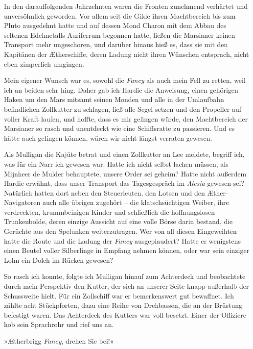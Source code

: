 In den darauffolgenden Jahrzehnten waren die Fronten zunehmend
verhärtet und unversöhnlich geworden. Vor allem seit die Gilde
ihren Machtbereich bis zum Pluto ausgedehnt hatte und auf dessen
Mond Charon mit dem Abbau des seltenen Edelmetalls Auriferrum
begonnen hatte, ließen die Marsianer keinen Transport mehr
ungeschoren, und darüber hinaus hieß es, dass sie mit den Kapitänen
der Ætherschiffe, deren Ladung nicht ihren Wünschen entsprach,
nicht eben zimperlich umgingen.

Mein eigener Wunsch war es, sowohl die \emph{Fancy} als auch mein
Fell zu retten, weil ich an beiden sehr hing. Daher gab ich Hardie
die Anweisung, einen gehörigen Haken um den Mars mitsamt seinen
Monden und alle in der Umlaufbahn befindlichen Zollkutter zu
schlagen, ließ alle Segel setzen und den Propeller auf voller Kraft
laufen, und hoffte, dass es mir gelingen würde, den Machtbereich
der Marsianer so rasch und unentdeckt wie eine Schiffsratte zu
passieren. Und es hätte auch gelingen können, wären wir nicht
längst verraten gewesen.

\bigpar

Als Mulligan die Kajüte betrat und einen Zollkutter an Lee meldete,
begriff ich, was für ein Narr ich gewesen war. Hatte ich nicht
selbst lachen müssen, als Mijnheer de Mulder behauptete, unsere
Order sei geheim? Hatte nicht außerdem Hardie erwähnt, dass unser
Transport das Tagesgespräch im \emph{Alesia} gewesen sei? Natürlich
hatten dort neben den Steuerleuten, den Lotsen und den
Æther-Navigatoren auch alle übrigen zugehört – die klatschsüchtigen
Weiber, ihre verdreckten, krummbeinigen Kinder und schließlich die
hoffnungslosen Trunkenbolde, deren einzige Aussicht auf eine volle
Börse darin bestand, die Gerüchte aus den Spelunken weiterzutragen.
Wer von all diesen Eingeweihten hatte die Route und die Ladung der
\emph{Fancy} ausgeplaudert? Hatte er wenigstens einen Beutel voller
Silberlinge in Empfang nehmen können, oder war sein einziger Lohn
ein Dolch im Rücken gewesen?

\bigpar

So rasch ich konnte, folgte ich Mulligan hinauf zum Achterdeck und
beobachtete durch mein Perspektiv den Kutter, der sich an unserer
Seite knapp außerhalb der Schussweite hielt. Für ein Zollschiff war
er bemerkenswert gut bewaffnet. Ich zählte acht Stückpforten, dazu
eine Reihe von Drehbassen, die an der Brüstung befestigt waren. Das
Achterdeck des Kutters war voll besetzt. Einer der Offiziere hob
sein Sprachrohr und rief uns an.

»Ætherbrigg \emph{Fancy}, drehen Sie bei!«

